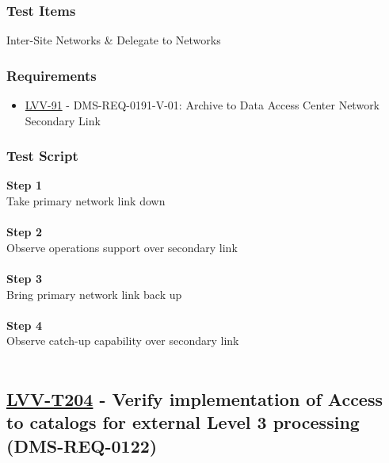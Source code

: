 \hypertarget{test-items-179}{%
\subsubsection{Test Items}\label{test-items-179}}

Inter-Site Networks \& Delegate to Networks

\hypertarget{requirements-180}{%
\subsubsection{Requirements}\label{requirements-180}}

\begin{itemize}
\tightlist
\item
  \href{https://jira.lsstcorp.org/browse/LVV-91}{LVV-91} -
  DMS-REQ-0191-V-01: Archive to Data Access Center Network Secondary
  Link
\end{itemize}

\hypertarget{test-script-180}{%
\subsubsection{Test Script}\label{test-script-180}}

\textbf{Step 1}\\
Take primary network link down\\
~\\
\textbf{Step 2}\\
Observe operations support over secondary link\\
~\\
\textbf{Step 3}\\
Bring primary network link back up\\
~\\
\textbf{Step 4}\\
Observe catch-up capability over secondary link\\
~\\

\hypertarget{lvv-t204---verify-implementation-of-access-to-catalogs-for-external-level-3-processing-dms-req-0122}{%
\subsection{\texorpdfstring{\href{https://jira.lsstcorp.org/secure/Tests.jspa\#/testCase/LVV-T204}{LVV-T204}
- Verify implementation of Access to catalogs for external Level 3
processing
(DMS-REQ-0122)}{LVV-T204 - Verify implementation of Access to catalogs for external Level 3 processing (DMS-REQ-0122)}}\label{lvv-t204---verify-implementation-of-access-to-catalogs-for-external-level-3-processing-dms-req-0122}}


